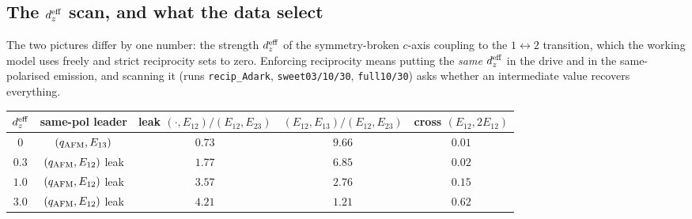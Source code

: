 \documentclass[11pt]{article}
\newcommand{\qafm}{q_{\rm AFM}}
\begin{document}
\subsection{The $d_z^{\rm eff}$ scan, and what the data select}
\label{si:sweetspot}

The two pictures differ by one number: the strength $d_z^{\rm eff}$ of
the symmetry-broken $c$-axis coupling to the $1\!\leftrightarrow\!2$
transition, which the working model uses freely and strict reciprocity
sets to zero.  Enforcing reciprocity means putting the \emph{same}
$d_z^{\rm eff}$ in the drive and in the same-polarised emission, and
scanning it (runs \texttt{recip\_Adark}, \texttt{sweet03/10/30},
\texttt{full10/30}) asks whether an intermediate value recovers
everything.

\begin{center}\small
\renewcommand{\arraystretch}{1.25}
\begin{tabular}{ccccc}
\toprule
$d_z^{\rm eff}$ & same-pol leader & leak $(\cdot,E_{12})/(E_{12},E_{23})$
& $(E_{12},E_{13})/(E_{12},E_{23})$ & cross $(E_{12},2E_{12})$\\
\midrule
$0$   & $(\qafm,E_{13})$ & $0.73$ & $9.66$ & $0.01$\\
$0.3$ & $(\qafm,E_{12})$ leak & $1.77$ & $6.85$ & $0.02$\\
$1.0$ & $(\qafm,E_{12})$ leak & $3.57$ & $2.76$ & $0.15$\\
$3.0$ & $(\qafm,E_{12})$ leak & $4.21$ & $1.21$ & $0.62$\\
\bottomrule
\end{tabular}
\end{center}
\end{document}
